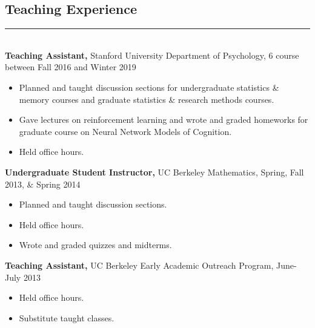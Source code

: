 \documentclass[margin]{res}
\begin{document}
\begin{resume}
\vspace{1pt}\section{Teaching Experience} \vspace{-15pt} \rule{\textwidth}{0.5pt} \\[3pt]
{\bf Teaching Assistant,} Stanford University Department of Psychology, 6 course between Fall 2016 and Winter 2019
\begin{itemize} \itemsep -2pt
  \item Planned and taught discussion sections for undergraduate statistics \& memory courses and graduate statistics \& research methods courses. \item Gave lectures on reinforcement learning and wrote and graded homeworks for graduate course on Neural Network Models of Cognition. \item Held office hours. \end{itemize}\vspace{-8pt}
{\bf Undergraduate Student Instructor,} UC Berkeley Mathematics, Spring, Fall 2013, \& Spring 2014 
\begin{itemize} \itemsep -2pt
  \item Planned and taught discussion sections. \item Held office hours. \item Wrote and graded quizzes and midterms. \end{itemize}\vspace{-8pt}
{\bf Teaching Assistant,} UC Berkeley Early Academic Outreach Program, June-July 2013
\begin{itemize} \itemsep -2pt
 \item Held office hours. \item Substitute taught classes. \end{itemize}


\end{resume}
\end{document}
